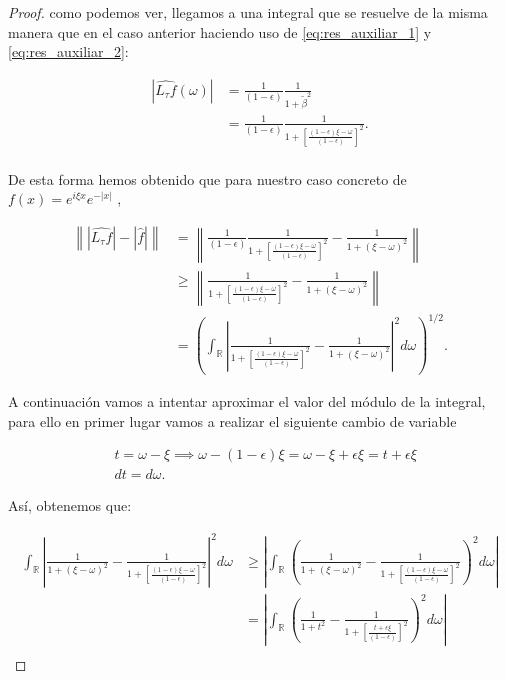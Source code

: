 \begin{proof}
\noindent como podemos ver, llegamos a una integral que se resuelve de la misma manera que en el caso anterior haciendo uso de \eqref{eq:res_auxiliar_1} y \eqref{eq:res_auxiliar_2}:

\begin{align*}
  |\widehat{L_\tau f}(\omega)| 
  &= \frac{1}{(1-\epsilon)} \frac{1}{1+\tilde{\beta}^2} \\
  &= \frac{1}{(1-\epsilon)} \frac{1}{1+\left[ \frac{(1-\epsilon) \xi - \omega}{(1-\epsilon)}\right]^2}. \\
\end{align*}


\noindent De esta forma hemos obtenido que para nuestro caso concreto de $f(x)=e^{i \xi x}e^{-|x|}$ ,


\begin{align*}
  \left\| |\widehat{L_\tau f}|-|\widehat{f}| \right\| &= \left\| \frac{1}{(1-\epsilon)} \frac{1}{1+\left[ \frac{(1-\epsilon) \xi - \omega}{(1-\epsilon)}\right]^2}-\frac{1}{1+(\xi - \omega)^2} \right\| \\
  &\geq  \left\| \frac{1}{1+\left[ \frac{(1-\epsilon) \xi - \omega}{(1-\epsilon)}\right]^2}-\frac{1}{1+(\xi - \omega)^2} \right\| \\
  &=\left(\int_{\mathbb{R}} \left| \frac{1}{1+\left[ \frac{(1-\epsilon) \xi - \omega}{(1-\epsilon)}\right]^2}-\frac{1}{1+(\xi - \omega)^2} \right|^2 d\omega\right)^{1/2}.
\end{align*}


\noindent A continuación vamos a intentar aproximar el valor del módulo de la integral, para ello en primer lugar vamos a realizar el siguiente cambio de variable 

\begin{align*}
  &t=\omega-\xi \implies \omega-(1-\epsilon)\xi= \omega-\xi + \epsilon\xi = t +\epsilon\xi \\
  &dt=d\omega.
\end{align*}

\noindent Así, obtenemos que: 

\begin{align*}
  \int_{\mathbb{R}} \left| \frac{1}{1+(\xi - \omega)^2} - \frac{1}{1+\left[ \frac{(1-\epsilon) \xi - \omega}{(1-\epsilon)}\right]^2} \right|^2 d\omega &\geq
  \left|\int_{\mathbb{R}} \left(  \frac{1}{1+(\xi - \omega)^2} - \frac{1}{1+\left[ \frac{(1-\epsilon) \xi - \omega}{(1-\epsilon)}\right]^2}  \right)^2 d\omega \right| \\
  &=\left|\int_{\mathbb{R}} \left(  \frac{1}{1+t^2} - \frac{1}{1+\left[ \frac{t+\epsilon\xi}{(1-\epsilon)}\right]^2}  \right)^2 d\omega \right| \\
\end{align*}


\end{proof}
